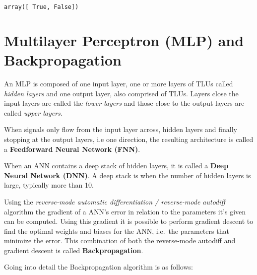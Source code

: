 \documentclass[12pt letter]{report}
\makeatletter
\newcommand{\boxspacing}{\kern\kvtcb@left@rule\kern\kvtcb@boxsep}
\newcommand{\prompt}[4]{
        {\ttfamily\llap{{\color{#2}[#3]:\hspace{3pt}#4}}\vspace{-\baselineskip}}
    }
\makeatother
\begin{document}
            \begin{tcolorbox}[breakable, size=fbox, boxrule=.5pt, pad at break*=1mm, opacityfill=0]
\prompt{Out}{outcolor}{2}{\boxspacing}
\begin{Verbatim}[commandchars=\\\{\}]
array([ True, False])
\end{Verbatim}
\end{tcolorbox}
        
\section{Multilayer Perceptron (MLP) and
Backpropagation}\label{multilayer-perceptron-mlp-and-backpropagation}

An MLP is composed of one input layer, one or more layers of TLUs called
\emph{hidden layers} and one output layer, also comprised of TLUs.
Layers close the input layers are called the \emph{lower layers} and
those close to the output layers are called \emph{upper layers}.

When signals only flow from the input layer across, hidden layers and
finally stopping at the output layers, i.e one direction, the resulting
architecture is called a \textbf{Feedforward Neural Network (FNN)}.

When an ANN contains a deep stack of hidden layers, it is called a
\textbf{Deep Neural Network (DNN)}. A deep stack is when the number of
hidden layers is large, typically more than 10.

Using the \emph{reverse-mode automatic differentiation / reverse-mode
autodiff} algorithm the gradient of a ANN's error in relation to the
parameters it's given can be computed. Using this gradient it is
possible to perform gradient descent to find the optimal weights and
biases for the ANN, i.e.~the parameters that minimize the error. This
combination of both the reverse-mode autodiff and gradient descent is
called \textbf{Backpropagation}.

Going into detail the Backpropagation algorithm is as follows:
\end{document}
